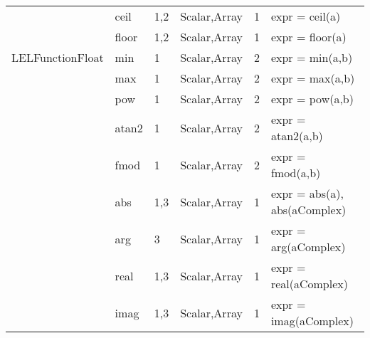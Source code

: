 \begin{center}
\begin{tabular}{|l|l|l|l|l|l}
                  &    ceil     &   1,2        &   Scalar,Array   &   1   &   expr = ceil(a) \\
                  &    floor    &   1,2        &   Scalar,Array   &   1   &   expr = floor(a) \\
LELFunctionFloat  &    min      &   1          &   Scalar,Array   &   2   &   expr = min(a,b) \\
                  &    max      &   1          &   Scalar,Array   &   2   &   expr = max(a,b) \\
                  &    pow      &   1          &   Scalar,Array   &   2   &   expr = pow(a,b) \\
                  &    atan2    &   1          &   Scalar,Array   &   2   &   expr = atan2(a,b) \\
                  &    fmod     &   1          &   Scalar,Array   &   2   &   expr = fmod(a,b) \\
                  &    abs      &   1,3        &   Scalar,Array   &   1   &   expr = abs(a), abs(aComplex) \\
                  &    arg      &   3          &   Scalar,Array   &   1   &   expr = arg(aComplex) \\
                  &    real     &   1,3        &   Scalar,Array   &   1   &   expr = real(aComplex) \\
                  &    imag     &   1,3        &   Scalar,Array   &   1   &   expr = imag(aComplex) \\
\hline
\end{tabular}
\end{center}
 

